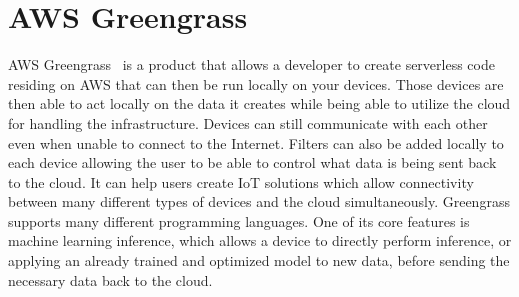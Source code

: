 \section{AWS Greengrass}
AWS Greengrass~\cite{hid-sp18-521-Greengrass} is a product that allows a
developer to create serverless code residing on AWS that can then be run
locally on your devices. Those devices are then able to act locally on the data
it creates while being able to utilize the cloud for handling the infrastructure. 
Devices can still communicate with each other even when unable to connect to the
Internet. Filters can also be added locally to each device allowing the user to be 
able to control what data is being sent back to the cloud. It can help users create
IoT solutions which allow connectivity between many different types of devices
and the cloud simultaneously. Greengrass supports many different programming 
languages. One of its core features is machine learning inference, which allows
a device to directly perform inference, or applying an already trained and 
optimized model to new data, before sending the necessary data back to the cloud.  
